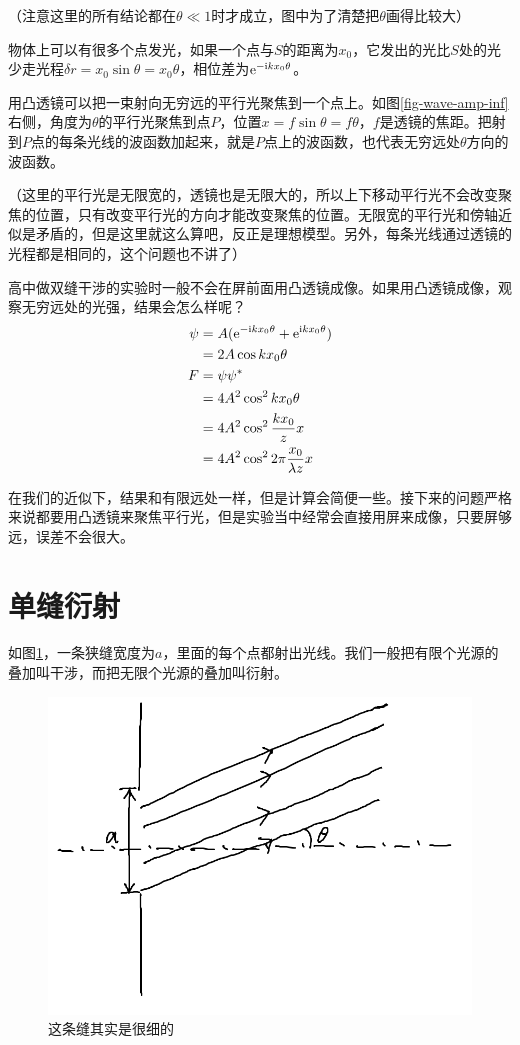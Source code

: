 （注意这里的所有结论都在$\theta \ll 1$时才成立，图中为了清楚把$\theta$画得比较大）

物体上可以有很多个点发光，如果一个点与$S$的距离为$x_0$，它发出的光比$S$处的光少走光程$\delta r=x_0 \sin \theta=x_0 \theta$，相位差为$\mathrm{e}^{-\mathrm{i} k x_0 \theta}$。

用凸透镜可以把一束射向无穷远的平行光聚焦到一个点上。如图\ref{fig-wave-amp-inf}右侧，角度为$\theta$的平行光聚焦到点$P$，位置$x=f \sin \theta=f \theta$，$f$是透镜的焦距。把射到$P$点的每条光线的波函数加起来，就是$P$点上的波函数，也代表无穷远处$\theta$方向的波函数。

（这里的平行光是无限宽的，透镜也是无限大的，所以上下移动平行光不会改变聚焦的位置，只有改变平行光的方向才能改变聚焦的位置。无限宽的平行光和傍轴近似是矛盾的，但是这里就这么算吧，反正是理想模型。另外，每条光线通过透镜的光程都是相同的，这个问题也不讲了）

高中做双缝干涉的实验时一般不会在屏前面用凸透镜成像。如果用凸透镜成像，观察无穷远处的光强，结果会怎么样呢？
\begin{align*}
\psi&=A(\mathrm{e}^{-\mathrm{i} k x_0 \theta}+\mathrm{e}^{\mathrm{i} k x_0 \theta}) \\
&=2 A \cos k x_0 \theta \\
F&=\psi \psi^* \\
&=4 A^2 \cos^2 k x_0 \theta \\
&=4 A^2 \cos^2 \frac{k x_0}{z} x \\
&=4 A^2 \cos^2 2 \pi \frac{x_0}{\lambda z} x
\end{align*}

在我们的近似下，结果和有限远处一样，但是计算会简便一些。接下来的问题严格来说都要用凸透镜来聚焦平行光，但是实验当中经常会直接用屏来成像，只要屏够远，误差不会很大。
\section{单缝衍射}
如图\ref{fig-silt-diff}，一条狭缝宽度为$a$，里面的每个点都射出光线。我们一般把有限个光源的叠加叫干涉，而把无限个光源的叠加叫衍射。
\begin{figure}[htb]
\centering
\includegraphics[scale=0.5]{fig/silt-diff}
\caption{这条缝其实是很细的}
\label{fig-silt-diff}
\end{figure}

